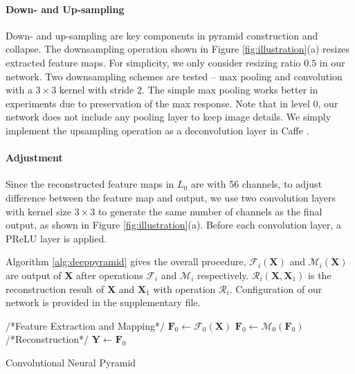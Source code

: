 \documentclass[10pt,twocolumn,letterpaper]{article}
\begin{document}
\vspace{-0.15in}\paragraph{Down- and Up-sampling} Down- and up-sampling are key
components in pyramid construction and collapse. The downsampling operation shown in
Figure \ref{fig:illustration}(a) resizes extracted feature maps. For simplicity, we only
consider resizing ratio $0.5$ in our network. Two downsampling schemes are tested -- max
pooling and convolution with a $3\times 3$ kernel with stride $2$. The simple max pooling
works better in experiments due to preservation of the max response. Note that in level
$0$, our network does not include any pooling layer to keep image details. We simply
implement the upsampling operation as a deconvolution layer in Caffe \cite{JiaSDKLGGD14}.

\vspace{-0.15in}\paragraph{Adjustment} Since the reconstructed feature maps in $L_0$ are
with 56 channels, to adjust difference between the feature map and output, we use two
convolution layers with kernel size $3\times 3$ to generate the same number of channels
as the final output, as shown in Figure \ref{fig:illustration}(a). Before each
convolution layer, a PReLU layer is applied.

Algorithm \ref{alg:deeppyramid} gives the overall procedure, $\mathcal{F}_i(\mathbf{X})$
and $\mathcal{M}_i(\mathbf{X})$ are output of $\mathbf{X}$ after operations
$\mathcal{F}_i$ and $\mathcal{M}_i$ respectively.
$\mathcal{R}_i(\mathbf{X},\mathbf{X}_1)$ is the reconstruction result of $\mathbf{X}$ and
$\mathbf{X}_1$ with operation $\mathcal{R}_i$. Configuration of our network is provided
in the supplementary file.

\begin{algorithm}[t]
    \BlankLine
    /*Feature Extraction and Mapping*/ \;
    $\mathbf{F}_0 \gets \mathcal{F}_0(\mathbf{X})$ \;
    $\mathbf{F}_0 \gets \mathcal{M}_0(\mathbf{F}_0)$ \;
    \BlankLine
    /*Reconstruction*/ \;
    \BlankLine
    $\mathbf{Y} \gets \mathbf{F}_0$ \;
    \caption{Convolutional Neural Pyramid}
    \label{alg:deeppyramid}
\end{algorithm}
\end{document}
